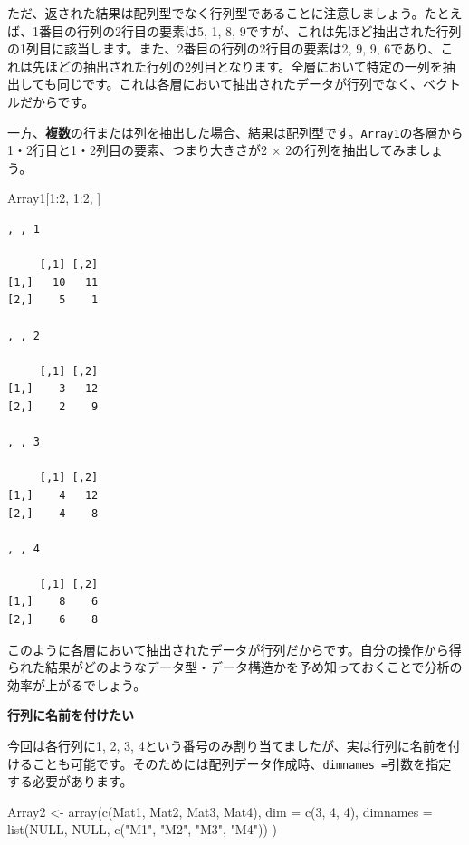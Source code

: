 \documentclass[
  a4paper,
  pandoc,
  ja=standard,
  jafont=haranoaji]{bxjsbook}
\newenvironment{Shaded}{\begin{snugshade}}{\end{snugshade}}
\newcommand{\AttributeTok}[1]{\textcolor[rgb]{0.00,0.48,0.65}{#1}}
\newcommand{\ConstantTok}[1]{\textcolor[rgb]{0.56,0.35,0.01}{#1}}
\newcommand{\DecValTok}[1]{\textcolor[rgb]{0.68,0.00,0.00}{#1}}
\newcommand{\FunctionTok}[1]{\textcolor[rgb]{0.28,0.35,0.67}{#1}}
\newcommand{\NormalTok}[1]{\textcolor[rgb]{0.00,0.48,0.65}{#1}}
\newcommand{\OtherTok}[1]{\textcolor[rgb]{0.00,0.48,0.65}{#1}}
\newcommand{\SpecialCharTok}[1]{\textcolor[rgb]{0.37,0.37,0.37}{#1}}
\newcommand{\StringTok}[1]{\textcolor[rgb]{0.13,0.47,0.30}{#1}}
\begin{document}
ただ、返された結果は配列型でなく行列型であることに注意しましょう。たとえば、1番目の行列の2行目の要素は5,
1, 8,
9ですが、これは先ほど抽出された行列の1列目に該当します。また、2番目の行列の2行目の要素は2,
9, 9,
6であり、これは先ほどの抽出された行列の2列目となります。全層において特定の一列を抽出しても同じです。これは各層において抽出されたデータが行列でなく、ベクトルだからです。

一方、\textbf{複数}の行または列を抽出した場合、結果は配列型です。\texttt{Array1}の各層から1・2行目と1・2列目の要素、つまり大きさが2
\(\times\) 2の行列を抽出してみましょう。

\begin{Shaded}
\begin{Highlighting}[numbers=left,,]
\NormalTok{Array1[}\DecValTok{1}\SpecialCharTok{:}\DecValTok{2}\NormalTok{, }\DecValTok{1}\SpecialCharTok{:}\DecValTok{2}\NormalTok{, ]}
\end{Highlighting}
\end{Shaded}

\begin{verbatim}
, , 1

     [,1] [,2]
[1,]   10   11
[2,]    5    1

, , 2

     [,1] [,2]
[1,]    3   12
[2,]    2    9

, , 3

     [,1] [,2]
[1,]    4   12
[2,]    4    8

, , 4

     [,1] [,2]
[1,]    8    6
[2,]    6    8
\end{verbatim}

このように各層において抽出されたデータが行列だからです。自分の操作から得られた結果がどのようなデータ型・データ構造かを予め知っておくことで分析の効率が上がるでしょう。

\textbf{行列に名前を付けたい}

今回は各行列に1, 2, 3,
4という番号のみ割り当てましたが、実は行列に名前を付けることも可能です。そのためには配列データ作成時、\texttt{dimnames\ =}引数を指定する必要があります。

\begin{Shaded}
\begin{Highlighting}[numbers=left,,]
\NormalTok{Array2 }\OtherTok{\textless{}{-}} \FunctionTok{array}\NormalTok{(}\FunctionTok{c}\NormalTok{(Mat1, Mat2, Mat3, Mat4), }\AttributeTok{dim =} \FunctionTok{c}\NormalTok{(}\DecValTok{3}\NormalTok{, }\DecValTok{4}\NormalTok{, }\DecValTok{4}\NormalTok{),}
                \AttributeTok{dimnames =} \FunctionTok{list}\NormalTok{(}\ConstantTok{NULL}\NormalTok{, }
                                \ConstantTok{NULL}\NormalTok{, }
                                \FunctionTok{c}\NormalTok{(}\StringTok{"M1"}\NormalTok{, }\StringTok{"M2"}\NormalTok{, }\StringTok{"M3"}\NormalTok{, }\StringTok{"M4"}\NormalTok{))}
\NormalTok{                )}
\end{Highlighting}
\end{Shaded}
\end{document}
